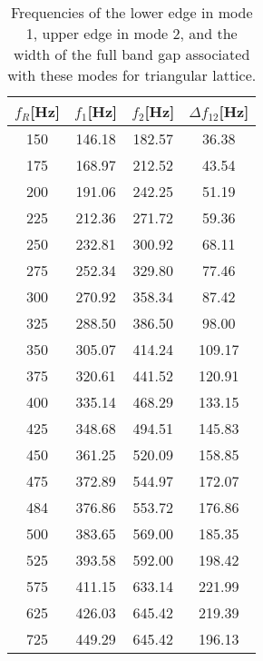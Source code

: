 \documentclass{article}
\begin{document}
\begin{table}[htb]
\centering
\caption{Frequencies of the lower edge in mode 1, upper edge in mode 2, and the width of the full band gap associated with these modes for triangular lattice.}
\label{tab300}
\begin{tabular}{cccc}
\hline
$f_R$[Hz] & $f_1$[Hz] & $f_2$[Hz] & $\Delta f _{12}$[Hz] \\ \hline
150 & 146.18 & 182.57 & 36.38 \\ \hline
175 & 168.97 & 212.52 & 43.54 \\ \hline
200 & 191.06 & 242.25 & 51.19 \\ \hline
225 & 212.36 & 271.72 & 59.36 \\ \hline
250 & 232.81 & 300.92 & 68.11 \\ \hline
275 & 252.34 & 329.80 & 77.46 \\ \hline
300 & 270.92 & 358.34 & 87.42 \\ \hline
325 & 288.50 & 386.50 & 98.00 \\ \hline
350 & 305.07 & 414.24 & 109.17 \\ \hline
375 & 320.61 & 441.52 & 120.91 \\ \hline
400 & 335.14 & 468.29 & 133.15 \\ \hline
425 & 348.68 & 494.51 & 145.83 \\ \hline
450 & 361.25 & 520.09 & 158.85 \\ \hline
475 & 372.89 & 544.97 & 172.07 \\ \hline
484 & 376.86 & 553.72 & 176.86 \\ \hline
500 & 383.65 & 569.00 & 185.35 \\ \hline
525 & 393.58 & 592.00 & 198.42 \\ \hline
575 & 411.15 & 633.14 & 221.99 \\ \hline
625 & 426.03 & 645.42 & 219.39 \\ \hline
725 & 449.29 & 645.42 & 196.13 \\ \hline
\end{tabular}
\end{table}
\end{document}
